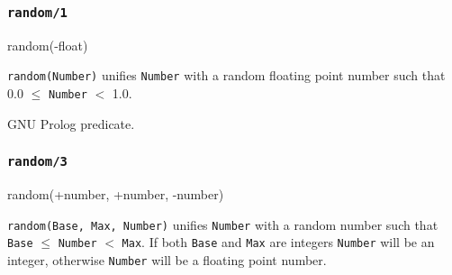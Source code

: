 \subsubsection{\texttt{random/1}}

\begin{TemplatesOneCol}
random(-float)

\end{TemplatesOneCol}

\Description

\texttt{random(Number)} unifies \texttt{Number} with a random floating point
number such that 0.0 $\leq$ \texttt{Number} $<$ 1.0.

\begin{PlErrors}


\end{PlErrors}

\Portability

GNU Prolog predicate.

\subsubsection{\texttt{random/3}}

\begin{TemplatesOneCol}
random(+number, +number, -number)

\end{TemplatesOneCol}

\Description

\texttt{random(Base, Max, Number)} unifies \texttt{Number} with a random
number such that \texttt{Base} $\leq$ \texttt{Number} $<$ \texttt{Max}. If
both \texttt{Base} and \texttt{Max} are integers \texttt{Number} will be an
integer, otherwise \texttt{Number} will be a floating point number.

\begin{PlErrors}






\end{PlErrors}

